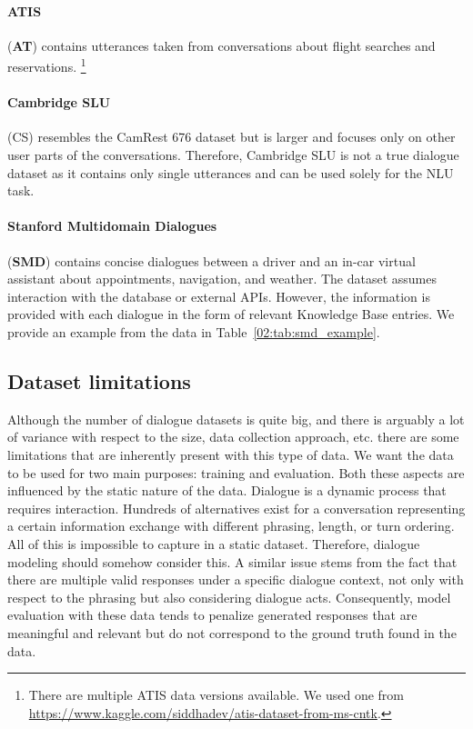\paragraph{ATIS} (\textbf{AT}) \cite{hemphill_atis_1990} contains utterances taken from conversations about flight searches and reservations. \footnote{There are multiple ATIS data versions available. We used one from \url{https://www.kaggle.com/siddhadev/atis-dataset-from-ms-cntk}.}

\paragraph{Cambridge SLU} (CS) \cite{henderson2012discriminative} resembles the CamRest 676 dataset but is larger and focuses only on other user parts of the conversations.
Therefore, Cambridge SLU is not a true dialogue dataset as it contains only single utterances and can be used solely for the NLU task.

\paragraph{Stanford Multidomain Dialogues} (\textbf{SMD}) \cite{eric-etal-2017-key} contains concise dialogues between a driver and an in-car virtual assistant about appointments, navigation, and weather.
The dataset assumes interaction with the database or external APIs.
However, the information is provided with each dialogue in the form of relevant Knowledge Base entries.
We provide an example from the data in Table~\ref{02:tab:smd_example}.

\subsection{Dataset limitations}
\label{02:sec:data-limits}
Although the number of dialogue datasets is quite big, and there is arguably a lot of variance with respect to the size, data collection approach, etc. there are some limitations that are inherently present with this type of data.
We want the data to be used for two main purposes: training and evaluation.
Both these aspects are influenced by the static nature of the data.
Dialogue is a dynamic process that requires interaction.
Hundreds of alternatives exist for a conversation representing a certain information exchange with different phrasing, length, or turn ordering.
All of this is impossible to capture in a static dataset.
Therefore, dialogue modeling should somehow consider this.
A similar issue stems from the fact that there are multiple valid responses under a specific dialogue context, not only with respect to the phrasing but also considering dialogue acts.
Consequently, model evaluation with these data tends to penalize generated responses that are meaningful and relevant but do not correspond to the ground truth found in the data.


